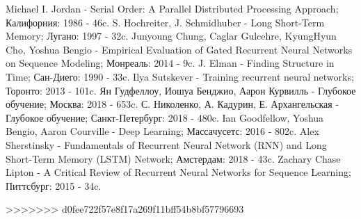 \documentclass[a4paper,russian]{article}
\begin{document}
\newpage

	
	\begin{thebibliography}{}
		  Michael I. Jordan	-	Serial Order: A Parallel Distributed Processing Approach; Калифорния: 1986 - 46c. 
		  S. Hochreiter, J. Schmidhuber	-	Long Short-Term Memory; Лугано: 1997 - 32c.
		  Junyoung Chung, Caglar Gulcehre, KyungHyun Cho, Yoshua Bengio	-	Empirical Evaluation of Gated Recurrent Neural Networks on Sequence Modeling; Монреаль: 2014 - 9c.
		 J. Elman	-	Finding Structure in Time; Сан-Диего:  1990 - 33c.
		 Ilya Sutskever	-	Training recurrent neural networks; Торонто: 2013 - 101c.
		 Ян Гудфеллоу, Иошуа Бенджио, Аарон Курвилль	-	Глубокое обучение; Москва: 2018 - 653c. 
		 С. Николенко, А. Кадурин, Е. Архангельская	-	Глубокое обучение;  Санкт-Петербург: 2018 - 480c.
		 Ian Goodfellow, Yoshua Bengio, Aaron Courville	-	Deep Learning; Массачусетс: 2016 - 802c.
		 Alex Sherstinsky	-	Fundamentals of Recurrent Neural Network (RNN) and Long Short-Term Memory (LSTM) Network; Амстердам: 2018 - 43c.
		 Zachary Chase Lipton	-	A Critical Review of Recurrent Neural Networks for Sequence Learning; Питтсбург: 2015 - 34c.
	\end{thebibliography}
>>>>>>> d0fee722f57e8f17a269f11bff54b8bf57796693
\end{document}
